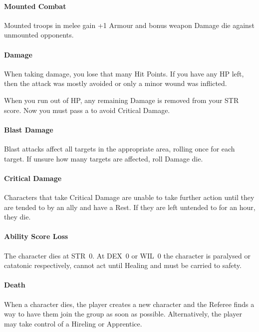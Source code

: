 \documentclass[itdr]{subfiles}
\begin{document}
\paragraph{Mounted Combat}

Mounted troops in melee gain +1 Armour and bonus weapon Damage die against unmounted opponents.

\paragraph{Damage}
When taking damage, you lose that many Hit Points. If you have any HP left, then the attack was mostly avoided or only a minor wound was inflicted.

When you run out of HP, any remaining Damage is removed from your STR score. Now you must pass a  to avoid Critical Damage.

\paragraph{Blast Damage}
Blast attacks affect all targets in the appropriate area, rolling once for each target. If unsure how many targets are affected, roll Damage die.

\paragraph{Critical Damage}
Characters that take Critical Damage are unable to take further action until they are tended to by an ally and have a Rest. If they are left untended to for an hour, they die.

\paragraph{Ability Score Loss}
The character dies at STR~0. At DEX~0 or WIL~0 the character is paralysed or catatonic respectively, cannot act until Healing and must be carried to safety.

\paragraph{Death}
When a character dies, the player creates a new character and the Referee finds a way to have them join the group as soon as possible. Alternatively, the player may take control of a Hireling or Apprentice.
\end{document}
